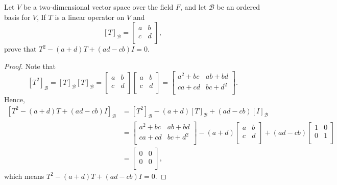 \begin{problem}
    Let \(V\) be a two-dimensional vector space over the field \(F\), and let \(\mathcal{B} \) be an ordered basis for \(V\), If \(T\) is a linear operator on \(V\) and 
    \[
        [T]_{\mathcal{B}} = \begin{bmatrix}
            a & b  \\
            c & d  \\
        \end{bmatrix},
    \] prove that \(T^2 - (a+d)T + (ad - cb)I = 0\). 
\end{problem}
\begin{proof}
    Note that 
    \[
        \left[ T^2 \right] _{\mathcal{B} } = [T]_{\mathcal{B} } [T]_{\mathcal{B} } = \begin{bmatrix}
            a & b  \\
            c & d  \\
        \end{bmatrix} \begin{bmatrix}
            a & b  \\
            c & d  \\
        \end{bmatrix} = \begin{bmatrix}
            a^2 + bc & ab + bd  \\
            ca + cd & bc + d^2  \\
        \end{bmatrix}.
    \]
    Hence, 
    \begin{align*}
        \left[ T^2 - (a + d)T + (ad - cb)I \right]_{\mathcal{B} } &= \left[ T^2 \right]_{\mathcal{B} } - (a+d)[T]_{\mathcal{B} } + (ad - cb)[I]_{\mathcal{B} } \\
        &= \begin{bmatrix}
            a^2 + bc & ab + bd  \\
            ca + cd & bc + d^2  \\
        \end{bmatrix} - (a + d) \begin{bmatrix}
            a & b  \\
            c & d  \\
        \end{bmatrix} + (ad - cb)\begin{bmatrix}
            1 & 0  \\
            0 & 1  \\
        \end{bmatrix} \\
         &= \begin{bmatrix}
            0 & 0  \\
            0 & 0  \\
         \end{bmatrix},
    \end{align*}
    which means \(T^2 - (a+d)T + (ad - cb)I = 0\). 
\end{proof}
